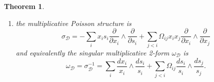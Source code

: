 \documentclass{amsart}
\newtheorem{theorem}{Theorem}[section]
\numberwithin{equation}{section}
\newcommand{\cD}{\mathcal{D}}
\begin{document}
\begin{theorem}
\begin{enumerate}
    \item the multiplicative Poisson structure is
    \begin{equation*}
      \sigma_\cD = -\sum_{i} x_i s_i \frac{\partial}{\partial x_i} \wedge \frac{\partial}{\partial s_i}+\sum_{j < i} \Omega_{ij}x_ix_j \frac{\partial}{\partial x_i} \wedge \frac{\partial}{\partial x_j}
    \end{equation*}
    and equivalently the singular multiplicative 2-form $\omega_\cD$ is
    \begin{equation*} 
      \omega_\cD = \sigma_\cD^{-1} = \sum_{i} \frac{dx_i}{x_i} \wedge \frac{ds_i}{s_i} + \sum_{j < i} \Omega_{ij} \frac{ds_i}{s_i} \wedge \frac{ds_j}{s_j}.
    \end{equation*}
  \end{enumerate}
\end{theorem}
\end{document}
